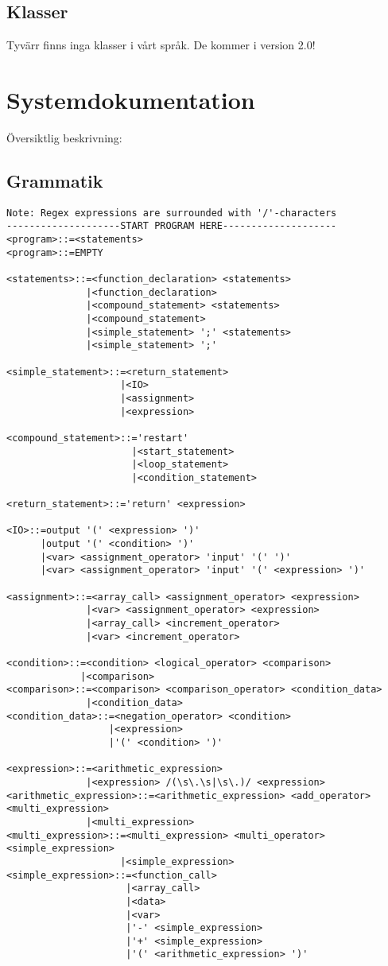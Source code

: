\documentclass{TDP003mall}
\begin{document}
\subsection{Klasser}
Tyvärr finns inga klasser i vårt språk. De kommer i version 2.0!

\section{Systemdokumentation}
Översiktlig  beskrivning:

\subsection{Grammatik}
\begin{lstlisting}
Note: Regex expressions are surrounded with '/'-characters
--------------------START PROGRAM HERE--------------------
<program>::=<statements>
<program>::=EMPTY

<statements>::=<function_declaration> <statements>
              |<function_declaration>              
              |<compound_statement> <statements>
              |<compound_statement>
              |<simple_statement> ';' <statements>
              |<simple_statement> ';'

<simple_statement>::=<return_statement>
                    |<IO>
                    |<assignment>
                    |<expression>

<compound_statement>::='restart'
                      |<start_statement>
                      |<loop_statement>
                      |<condition_statement> 

<return_statement>::='return' <expression>

<IO>::=output '(' <expression> ')'
      |output '(' <condition> ')'
      |<var> <assignment_operator> 'input' '(' ')'
      |<var> <assignment_operator> 'input' '(' <expression> ')'

<assignment>::=<array_call> <assignment_operator> <expression>
              |<var> <assignment_operator> <expression>
              |<array_call> <increment_operator>
              |<var> <increment_operator>

<condition>::=<condition> <logical_operator> <comparison>
             |<comparison>
<comparison>::=<comparison> <comparison_operator> <condition_data>
              |<condition_data>
<condition_data>::=<negation_operator> <condition>
                  |<expression>
                  |'(' <condition> ')'

<expression>::=<arithmetic_expression>
              |<expression> /(\s\.\s|\s\.)/ <expression>
<arithmetic_expression>::=<arithmetic_expression> <add_operator> <multi_expression>
              |<multi_expression>
<multi_expression>::=<multi_expression> <multi_operator> <simple_expression>
                    |<simple_expression>
<simple_expression>::=<function_call>
                     |<array_call>
                     |<data>
                     |<var>
                     |'-' <simple_expression>
                     |'+' <simple_expression>
                     |'(' <arithmetic_expression> ')'


\end{lstlisting}
\end{document}
